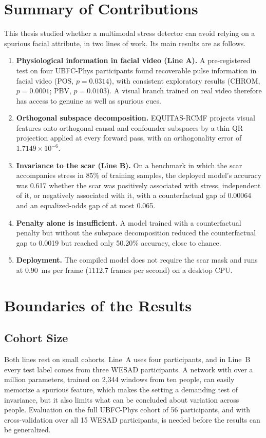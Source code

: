 \section{Summary of Contributions}
This thesis studied whether a multimodal stress detector can avoid relying on a spurious facial attribute, in two lines of work. Its main results are as follows.
\begin{enumerate}
    \item \textbf{Physiological information in facial video (Line A).} A pre-registered test on four UBFC-Phys participants found recoverable pulse information in facial video (POS, $p = 0.0314$), with consistent exploratory results (CHROM, $p = 0.0001$; PBV, $p = 0.0103$). A visual branch trained on real video therefore has access to genuine as well as spurious cues.
    \item \textbf{Orthogonal subspace decomposition.} EQUITAS-RCMF projects visual features onto orthogonal causal and confounder subspaces by a thin QR projection applied at every forward pass, with an orthogonality error of $1.7149 \times 10^{-6}$.
    \item \textbf{Invariance to the scar (Line B).} On a benchmark in which the scar accompanies stress in 85\% of training samples, the deployed model's accuracy was 0.617 whether the scar was positively associated with stress, independent of it, or negatively associated with it, with a counterfactual gap of 0.00064 and an equalized-odds gap of at most 0.065.
    \item \textbf{Penalty alone is insufficient.} A model trained with a counterfactual penalty but without the subspace decomposition reduced the counterfactual gap to 0.0019 but reached only 50.20\% accuracy, close to chance.
    \item \textbf{Deployment.} The compiled model does not require the scar mask and runs at 0.90~ms per frame (1112.7 frames per second) on a desktop CPU.
\end{enumerate}

\section{Boundaries of the Results}
\subsection{Cohort Size}
Both lines rest on small cohorts. Line~A uses four participants, and in Line~B every test label comes from three WESAD participants. A network with over a million parameters, trained on 2,344 windows from ten people, can easily memorize a spurious feature, which makes the setting a demanding test of invariance, but it also limits what can be concluded about variation across people. Evaluation on the full UBFC-Phys cohort of 56 participants, and with cross-validation over all 15 WESAD participants, is needed before the results can be generalized.

